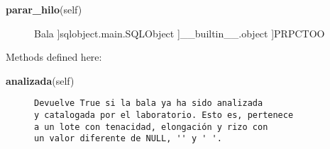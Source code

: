 \begin{description}\item[{\bf parar\_hilo}(self)\end{description}

 \par 


~\\
class {\bf Bala}(sqlobject.main.SQLObject, PRPCTOO)
    
{\tt ~~~}~
\begin{description}\item[Method resolution order:
]Bala
]sqlobject.main.SQLObject
]\_\_builtin\_\_.object
]PRPCTOO
\end{description}

Methods defined here:\\
\begin{description}\item[{\bf analizada}(self)]{\tt Devuelve~True~si~la~bala~ya~ha~sido~analizada\\
y~catalogada~por~el~laboratorio.~Esto~es,~pertenece\\
a~un~lote~con~tenacidad,~elongación~y~rizo~con~\\
un~valor~diferente~de~NULL,~\verb|''|~y~\verb|'|~\verb|'|.}\end{description}


